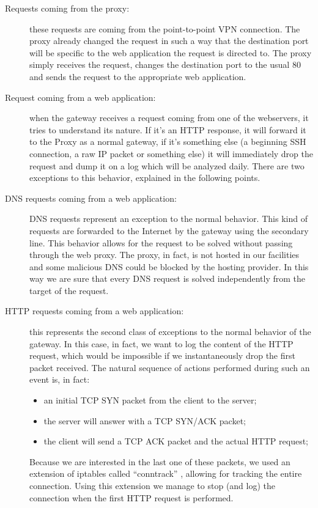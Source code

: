 \begin{description}
\item[Requests coming from the proxy: ] these requests are coming from the point-to-point VPN connection. The proxy already changed the request in such a way that the destination port will be specific to the web application the request is directed to. The proxy simply receives the request, changes the destination port to the usual 80 and sends the request to the appropriate web application.

\item[Request coming from a web application: ] when the gateway receives a request coming from one of the webservers, it tries to understand its nature. If it's an HTTP response, it will forward it to the Proxy as a normal gateway, if it's something else (a beginning SSH connection, a raw IP packet or something else) it will immediately drop the request and dump it on a log which will be analyzed daily. There are two exceptions to this behavior, explained in the following points.

\item[DNS requests coming from a web application: ] DNS requests represent an exception to the normal behavior. This kind of requests are forwarded to the Internet by the gateway using the secondary line. This behavior allows for the request to be solved without passing through the web proxy. The proxy, in fact, is not hosted in our facilities and some malicious DNS could be blocked by the hosting provider. In this way we are sure that every DNS request is solved independently from the target of the request.

\item[HTTP requests coming from a web application: ] this represents the second class of exceptions to the normal behavior of the gateway. In this case, in fact, we want to log the content of the HTTP request, which would be impossible if we instantaneously drop the first packet received. The natural sequence of actions performed during such an event is, in fact:
\begin{itemize}
\item an initial TCP SYN packet from the client to the server;
\item the server will answer with a TCP SYN/ACK packet;
\item the client will send a TCP ACK packet and the actual HTTP request;
\end{itemize}
Because we are interested in the last one of these packets, we used an extension of iptables called ``conntrack'' \cite{conntrack}, allowing for tracking the entire connection. Using this extension we manage to stop (and log) the connection when the first HTTP request is performed.
\end{description}


